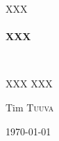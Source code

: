 \begin{titlepage}
\begin{center}


\textsc{\Large XXX}\\[1.0cm]
\HRule \\[0.4cm]
{ \huge \bfseries XXX \\[0.4cm] }

\HRule \\[1.5cm]

\noindent
\begin{minipage}{0.4\textwidth}
\begin{flushleft} \large
XXX \textsc{XXX}
\end{flushleft}
\end{minipage}%
\begin{minipage}{0.4\textwidth}
\begin{flushright} \large
Tim \textsc{Tuuva}
\end{flushright}
\end{minipage}

\vfill

{\large \today}

\end{center}
\end{titlepage}

\tableofcontents
\baselineskip=16pt
\parindent=15pt
\parskip=5pt

\begin{abstract}

\end{abstract}
